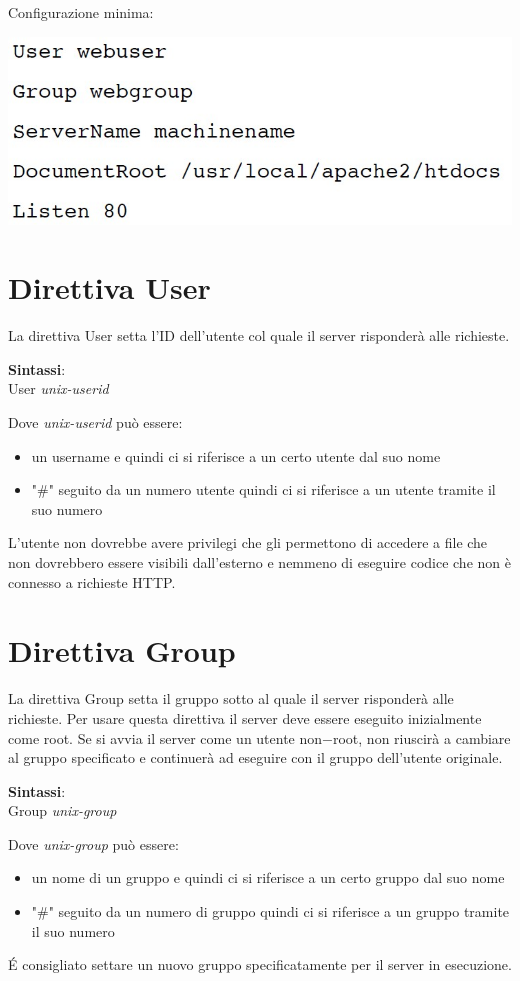Configurazione minima:
\begin{center}
\includegraphics[scale=0.4]{Images/TecnologieWeb/2/ConfigurazioneMinima.jpg}    
\end{center}

\section{Direttiva User}
La direttiva User setta l'ID dell'utente col quale il server risponderà alle richieste. \\
\begin{center}
    \textbf{Sintassi}: \\
User \emph{unix-userid} \\
\end{center}
Dove  \emph{unix-userid} può essere:
\begin{itemize}
    \item un username e quindi ci si riferisce a un certo utente dal suo nome
    \item "\#" seguito da un numero utente quindi ci si riferisce a un utente tramite il suo numero 
\end{itemize}
L'utente non dovrebbe avere privilegi che gli permettono di accedere a file che non dovrebbero essere visibili dall'esterno e nemmeno di eseguire codice che non è connesso a richieste HTTP.

\section{Direttiva Group}
La direttiva Group setta il gruppo sotto al quale il server risponderà alle richieste. Per usare questa direttiva il server deve essere eseguito inizialmente come root. Se si avvia il server come un utente non$-$root, non riuscirà a cambiare al gruppo specificato e continuerà ad eseguire con il gruppo dell'utente originale.  \\
\begin{center}
    \textbf{Sintassi}: \\
Group \emph{unix-group} \\
\end{center}
Dove  \emph{unix-group} può essere:
\begin{itemize}
    \item un nome di un gruppo e quindi ci si riferisce a un certo gruppo dal suo nome
    \item "\#" seguito da un numero di gruppo quindi ci si riferisce a un gruppo tramite il suo numero 
\end{itemize}
\'E consigliato settare un nuovo gruppo specificatamente per il server in esecuzione.

